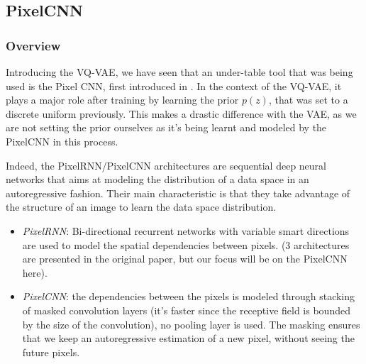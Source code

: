 \subsection{PixelCNN}

\subsubsection{Overview}

Introducing the VQ-VAE, we have seen that an under-table tool that was being used is the Pixel CNN,
first introduced in \cite{pixel_cnn_paper}.
In the context of the VQ-VAE, it plays a major role after training by learning the prior $p(z)$, that was set
to a discrete uniform previously.
This makes a drastic difference with the VAE, as we are not setting the prior ourselves as it's being learnt and modeled by the PixelCNN in this process.
\medskip

Indeed, the PixelRNN/PixelCNN architectures are sequential deep neural networks that aims at modeling the distribution of a data space
in an autoregressive fashion.
Their main characteristic is that they take advantage of the structure of an image to learn the data space distribution.
\begin{itemize}
    \item \textit{PixelRNN}: Bi-directional recurrent networks with variable smart directions are used to model the spatial dependencies between pixels.
    (3 architectures are presented in the original paper, but our focus will be on the PixelCNN here).

    \item \textit{PixelCNN}: the dependencies between the pixels is modeled through stacking of masked convolution layers (it's faster since the receptive field is bounded by the size of the convolution), no pooling layer is used.
    The masking ensures that we keep an autoregressive estimation of a new pixel, without seeing the future pixels.
\end{itemize}

